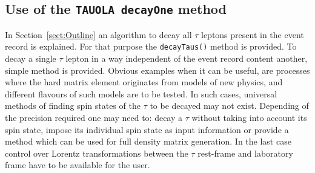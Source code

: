 \documentclass[]{Tauola_interface_design}
\begin{document}
\subsection{Use of the {\tt TAUOLA decayOne} method}
\label{TAUOLAgun}

In Section~\ref{sect:Outline} an algorithm to decay all $\tau$ leptons present in the event 
record is explained. For that purpose the {\tt decayTaus()} method is provided.
To decay a single $\tau$ lepton in a way independent of the
event record content another, simple method is provided. 
Obvious examples when it can be useful, 
are processes where the hard matrix element originates from models
of new physics, and different flavours of such models are to be tested.
  In such cases,
universal methods of finding spin states of the $\tau$ to be decayed may not exist. 
 Depending of the precision required one may need to: decay 
a $\tau$ without taking into account its spin state, impose its individual 
spin state as input information or provide a method which can be used for full density matrix 
generation. In the last case control over Lorentz transformations between 
the $\tau$ rest-frame and laboratory frame have to be available for the  
user.
\end{document}
